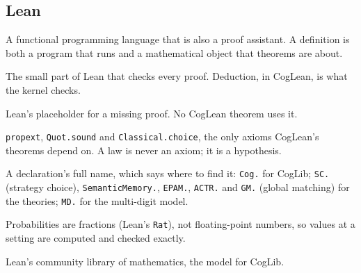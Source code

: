 \documentclass[11pt]{article}
\newcommand{\code}[1]{\texttt{#1}}
\begin{document}
\subsection*{Lean}
\begin{description}[leftmargin=1em,itemsep=1pt,font=\normalfont\itshape]
\item[Lean.] A functional programming language that is also a proof assistant. A definition is both a program that runs and a mathematical object that theorems are about.
\item[Kernel.] The small part of Lean that checks every proof. Deduction, in CogLean, is what the kernel checks.
\item[\code{sorry}.] Lean's placeholder for a missing proof. No CogLean theorem uses it.
\item[Standard axioms.] \code{propext}, \code{Quot.sound} and \code{Classical.choice}, the only axioms CogLean's theorems depend on. A law is never an axiom; it is a hypothesis.
\item[Fully qualified name.] A declaration's full name, which says where to find it: \texttt{Cog.} for CogLib; \texttt{SC.} (strategy choice), \texttt{SemanticMemory.}, \texttt{EPAM.}, \texttt{ACTR.} and \texttt{GM.} (global matching) for the theories; \texttt{MD.} for the multi-digit model.
\item[Exact rationals.] Probabilities are fractions (Lean's \code{Rat}), not floating-point numbers, so values at a setting are computed and checked exactly.
\item[Mathlib.] Lean's community library of mathematics, the model for CogLib.
\end{description}
\end{document}
